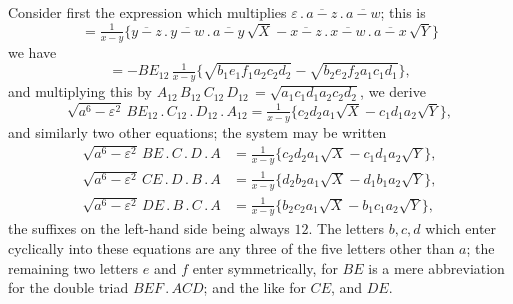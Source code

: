 \documentclass[11pt]{article}
\begin{document}
Consider first the expression which multiplies $\varepsilon\mathbin{.}\overline{a-z}\mathbin{.}\overline{a-w}$; this is
\[
= \tfrac{1}{x-y}\bigl\{\overline{y-z}\mathbin{.}\overline{y-w}\mathbin{.}\overline{a-y}\,\sqrt{X} - \overline{x-z}\mathbin{.}\overline{x-w}\mathbin{.}\overline{a-x}\,\sqrt{Y}\bigr\}
\]
we have
\[
= -BE_{12}\, \tfrac{1}{x-y}\bigl\{\sqrt{b_1 e_1 f_1 a_2 c_2 d_2} - \sqrt{b_2 e_2 f_2 a_1 c_1 d_1}\bigr\},
\]
and multiplying this by $A_{12}\, B_{12}\, C_{12}\, D_{12}\, = \sqrt{a_1 c_1 d_1 a_2 c_2 d_2}$, we derive
\[
\sqrt{a^6 - \varepsilon^2}\, BE_{12}\mathbin{.}C_{12}\mathbin{.}D_{12}\mathbin{.}A_{12} = \tfrac{1}{x-y}\bigl\{c_2 d_2 a_1 \sqrt{X} - c_1 d_1 a_2 \sqrt{Y}\bigr\},
\]
and similarly two other equations; the system may be written
\begin{align*}
\sqrt{a^6-\varepsilon^2}\, BE\mathbin{.}C\mathbin{.}D\mathbin{.}A &= \tfrac{1}{x-y}\bigl\{c_2 d_2 a_1 \sqrt{X} - c_1 d_1 a_2 \sqrt{Y}\bigr\},\\
\sqrt{a^6-\varepsilon^2}\, CE\mathbin{.}D\mathbin{.}B\mathbin{.}A &= \tfrac{1}{x-y}\bigl\{d_2 b_2 a_1 \sqrt{X} - d_1 b_1 a_2 \sqrt{Y}\bigr\},\\
\sqrt{a^6-\varepsilon^2}\, DE\mathbin{.}B\mathbin{.}C\mathbin{.}A &= \tfrac{1}{x-y}\bigl\{b_2 c_2 a_1 \sqrt{X} - b_1 c_1 a_2 \sqrt{Y}\bigr\},
\end{align*}
the suffixes on the left-hand side being always $12$. The letters $b,c,d$ which enter cyclically into these equations are any three of the five letters other than $a$; the remaining two letters $e$ and $f$ enter symmetrically, for $BE$ is a mere abbreviation for the double triad $BEF\mathbin{.}ACD$; and the like for $CE$, and $DE$.

\bigskip
\end{document}
